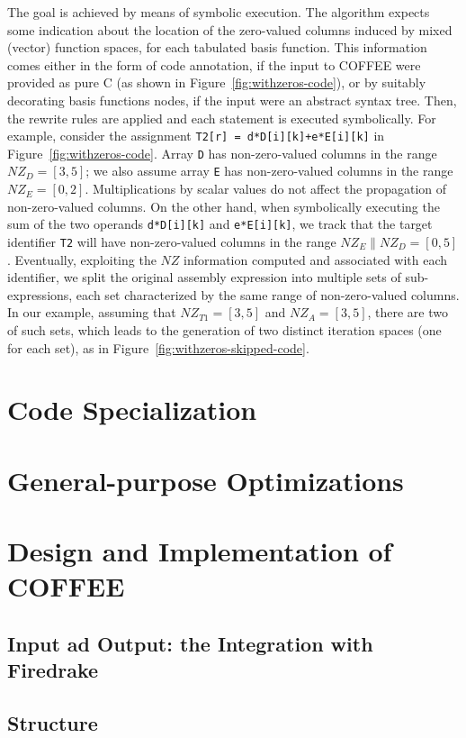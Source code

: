 The goal is achieved by means of symbolic execution. The algorithm expects some indication about the location of the zero-valued columns induced by mixed (vector) function spaces, for each tabulated basis function. This information comes either in the form of code annotation, if the input to COFFEE were provided as pure C (as shown in Figure~\ref{fig:withzeros-code}), or by suitably decorating basis functions nodes, if the input were an abstract syntax tree. Then, the rewrite rules are applied and each statement is executed symbolically. For example, consider the assignment \texttt{T2[r] = d*D[i][k]+e*E[i][k]} in Figure~\ref{fig:withzeros-code}. Array \texttt{D} has non-zero-valued columns in the range $NZ_D=[3,5]$; we also assume array \texttt{E} has non-zero-valued columns in the range $NZ_E=[0,2]$. Multiplications by scalar values do not affect the propagation of non-zero-valued columns. On the other hand, when symbolically executing the sum of the two operands \texttt{d*D[i][k]} and \texttt{e*E[i][k]}, we track that the target identifier \texttt{T2} will have non-zero-valued columns in the range $NZ_E \| NZ_D=[0,5]$. Eventually, exploiting the $NZ$ information computed and associated with each identifier, we split the original assembly expression into multiple sets of sub-expressions, each set characterized by the same range of non-zero-valued columns. In our example, assuming that $NZ_{T1}=[3,5]$ and $NZ_A=[3,5]$, there are two of such sets, which leads to the generation of two distinct iteration spaces (one for each set), as in Figure~\ref{fig:withzeros-skipped-code}.

\section{Code Specialization}
\label{sec:coffee-code-spec}
\section{General-purpose Optimizations}

\section{Design and Implementation of COFFEE}
\label{sec:coffee-implementation}
\subsection{Input ad Output: the Integration with Firedrake}
\subsection{Structure}
